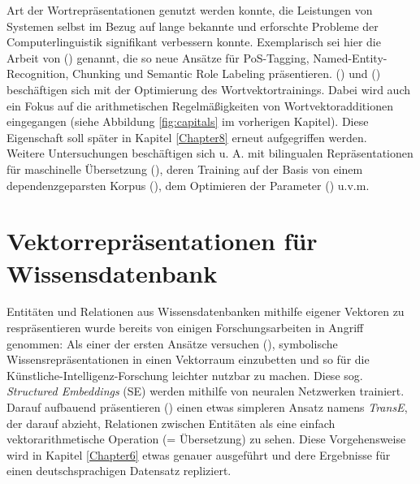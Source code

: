 Art der Wortrepräsentationen genutzt werden konnte, die Leistungen von Systemen selbst im Bezug auf lange bekannte und
erforschte Probleme der Computerlinguistik signifikant verbessern konnte. Exemplarisch sei hier die Arbeit von
(\cite{collobert2011natural}) genannt, die so neue Ansätze für PoS-Tagging, Named-Entity-Recognition, Chunking und Semantic
Role Labeling präsentieren. (\cite{mikolov2013efficient}) und (\cite{mikolov2013distributed}) beschäftigen sich mit der
Optimierung des Wortvektortrainings. Dabei wird auch ein Fokus auf die arithmetischen Regelmäßigkeiten von Wortvektoradditionen
eingegangen (siehe Abbildung \ref{fig:capitals} im vorherigen Kapitel). Diese Eigenschaft soll später in Kapitel \ref{Chapter8} erneut
aufgegriffen werden.\\

Weitere Untersuchungen beschäftigen sich u. A. mit bilingualen Repräsentationen für maschinelle Übersetzung (\cite{zou2013bilingual}),
deren Training auf der Basis von einem dependenzgeparsten Korpus (\cite{levy2014dependency}), dem Optimieren der Parameter
(\cite{levy2015improving}) u.v.m.


\section{Vektorrepräsentationen für Wissensdatenbank}

Entitäten und Relationen aus Wissensdatenbanken mithilfe eigener Vektoren zu respräsentieren wurde bereits von einigen
Forschungsarbeiten in Angriff genommen: Als einer der ersten Ansätze versuchen (\cite{bordes2011learning}), symbolische
Wissensrepräsentationen in einen Vektorraum einzubetten und so für die Künstliche-Intelligenz-Forschung leichter nutzbar
zu machen. Diese sog. \emph{Structured Embeddings} (SE) werden mithilfe von neuralen Netzwerken trainiert.
Darauf aufbauend präsentieren (\cite{bordes2013translating}) einen etwas simpleren Ansatz namens \emph{TransE}, der darauf abzieht, Relationen
zwischen Entitäten als eine einfach vektorarithmetische Operation (= Übersetzung) zu sehen. Diese Vorgehensweise wird in Kapitel \ref{Chapter6}
etwas genauer ausgeführt und dere Ergebnisse für einen deutschsprachigen Datensatz repliziert.\\

